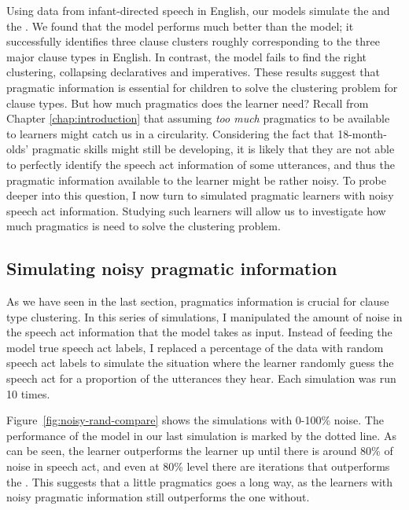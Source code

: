 Using data from infant-directed speech in English, our models simulate the \distlearner{} and the \praglearner{}.
 We found that the \plearnerabbr{} model performs much better than the \dlearnerabbr{} model; it successfully identifies three clause clusters roughly corresponding to the three major clause types in English. In contrast, the \dlearnerabbr{} model fails to find the right clustering, collapsing declaratives and imperatives. These results suggest that pragmatic information is essential for children to solve the clustering problem for clause types. But how much pragmatics does the learner need? Recall from Chapter \ref{chap:introduction} that assuming \emph{too much} pragmatics to be available to learners might catch us in a circularity. Considering the fact that 18-month-olds' pragmatic skills might still be developing, it is likely that they are not able to perfectly identify the speech act information of some utterances, and thus the pragmatic information available to the learner might be rather noisy. To probe deeper into this question, I now turn to simulated pragmatic learners with noisy speech act information. Studying such learners will allow us to investigate how much pragmatics is need to solve the clustering problem. 



\subsection{Simulating noisy pragmatic information} 
\label{sec:engcl:model:noisy}
As we have seen in the last section, pragmatics information is crucial for clause type clustering. In this series of simulations, I manipulated the amount of noise in the speech act information that the \plearnerabbr{} model takes as input. Instead of feeding the model true speech act labels, I replaced a percentage of the data with random speech act labels to simulate the situation where the learner randomly guess the speech act for a proportion of the utterances they hear. Each simulation was run 10 times. 

Figure~\ref{fig:noisy-rand-compare} shows the simulations with 0-100\% noise. The performance of the \dlearnerabbr{} model in our last simulation is marked by the dotted line. As can be seen, the \plearnerabbr{} learner outperforms the \dlearnerabbr{} learner up until there is around 80\% of noise in speech act, and even at 80\% level there are iterations that outperforms the \dlearnerabbr{}. This suggests that a little pragmatics goes a long way, as the learners with noisy pragmatic information still outperforms the one without. 

